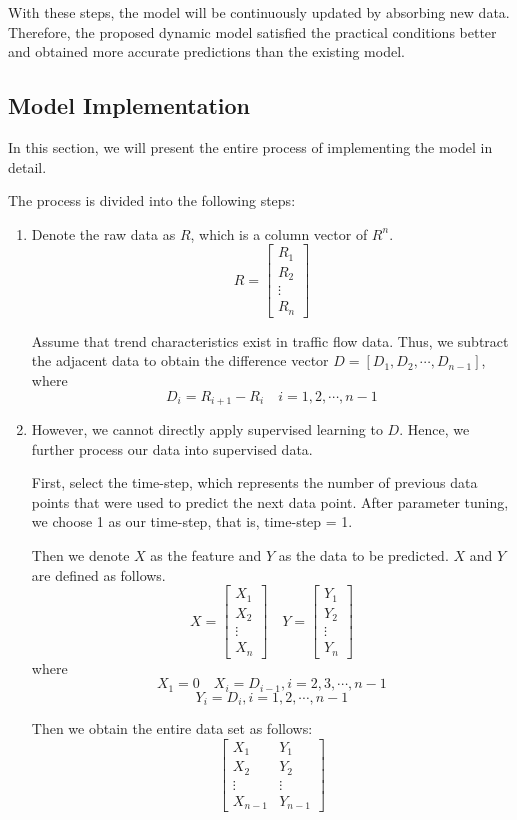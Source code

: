 \documentclass[twocolumn]{article}
\begin{document}
\par
With these steps, the model will be continuously updated by absorbing new data. Therefore, the proposed dynamic model satisfied the practical conditions better and obtained more accurate predictions than the existing model.
\subsection{Model Implementation}
In this section, we will present the entire process of implementing the model in detail.
\par
The process is divided into the following steps:
\begin{enumerate}[Step 1]
\item\label{step:11} Denote the raw data as $R$, which is a column vector of $R^n$. 
\[
R=\begin{bmatrix}
R_1\\
R_2\\
\vdots\\
R_n
\end{bmatrix}
\]
\par
Assume that trend characteristics exist in traffic flow data. Thus, we subtract the adjacent data to obtain the difference vector $D=[D_1, D_2, \cdots, D_{n-1}]$, where
\[
D_i = R_{i+1}-R_i \quad i = 1,2,\cdots,n-1
\]
\item\label{step:22} However, we cannot directly apply supervised learning to $D$. Hence, we further process our data into supervised data. 
\par
First, select the time-step, which represents the number of previous data points that were used to predict the next data point. After parameter tuning, we choose 1 as our time-step, that is, time-step = 1. 
\par
Then we denote $X$ as the feature and $Y$ as the data to be predicted. $X$ and $Y$ are defined as follows.
\[
X = \begin{bmatrix}
X_1\\
X_2\\
\vdots\\
X_n
\end{bmatrix}
\quad
Y = \begin{bmatrix}
Y_1\\
Y_2\\
\vdots\\
Y_n
\end{bmatrix}
\]
where
\[
X_1 = 0\quad X_i = D_{i-1},i= 2,3,\cdots,n-1
\]
\[
Y_i = D_{i}, i = 1,2,\cdots,n-1
\]
\par
Then we obtain the entire data set as follows:
\[
\begin{bmatrix}
X_1&Y_1\\
X_2&Y_2\\
\vdots & \vdots\\
X_{n-1} &Y_{n-1}
\end{bmatrix}
\]


\end{enumerate}
\end{document}
